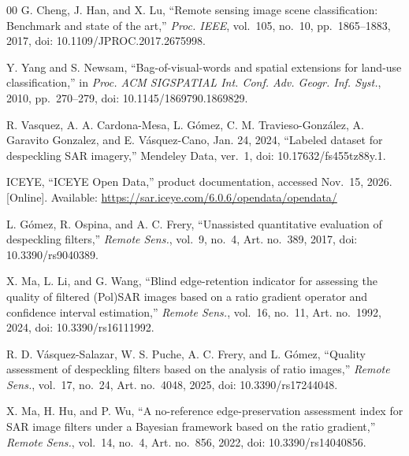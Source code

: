 \documentclass[journal]{IEEEtran}
\begin{document}
\begin{thebibliography}{00}
G. Cheng, J. Han, and X. Lu, ``Remote sensing image scene classification: Benchmark and state of the art,'' \emph{Proc. IEEE}, vol.~105, no.~10, pp.~1865--1883, 2017, doi: 10.1109/JPROC.2017.2675998.

Y. Yang and S. Newsam, ``Bag-of-visual-words and spatial extensions for land-use classification,'' in \emph{Proc. ACM SIGSPATIAL Int. Conf. Adv. Geogr. Inf. Syst.}, 2010, pp.~270--279, doi: 10.1145/1869790.1869829.

R. Vasquez, A. A. Cardona-Mesa, L. G\'omez, C. M. Travieso-Gonz\'alez, A. Garavito Gonzalez, and E. V\'asquez-Cano, Jan. 24, 2024, ``Labeled dataset for despeckling SAR imagery,'' Mendeley Data, ver.~1, doi: 10.17632/fs455tz88y.1.

ICEYE, ``ICEYE Open Data,'' product documentation, accessed Nov.~15, 2026. [Online]. Available: \url{https://sar.iceye.com/6.0.6/opendata/opendata/}

L. G\'omez, R. Ospina, and A. C. Frery, ``Unassisted quantitative evaluation of despeckling filters,'' \emph{Remote Sens.}, vol.~9, no.~4, Art. no.~389, 2017, doi: 10.3390/rs9040389.

X. Ma, L. Li, and G. Wang, ``Blind edge-retention indicator for assessing the quality of filtered (Pol)SAR images based on a ratio gradient operator and confidence interval estimation,'' \emph{Remote Sens.}, vol.~16, no.~11, Art. no.~1992, 2024, doi: 10.3390/rs16111992.

R. D. V\'asquez-Salazar, W. S. Puche, A. C. Frery, and L. G\'omez, ``Quality assessment of despeckling filters based on the analysis of ratio images,'' \emph{Remote Sens.}, vol.~17, no.~24, Art. no.~4048, 2025, doi: 10.3390/rs17244048.

X. Ma, H. Hu, and P. Wu, ``A no-reference edge-preservation assessment index for SAR image filters under a Bayesian framework based on the ratio gradient,'' \emph{Remote Sens.}, vol.~14, no.~4, Art. no.~856, 2022, doi: 10.3390/rs14040856.

\end{thebibliography}
\end{document}
